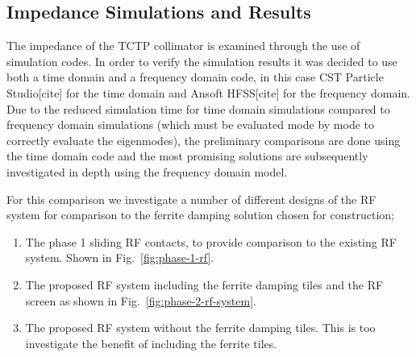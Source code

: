 \subsection{Impedance Simulations and Results}
\label{sec:imp-sims-tctp}

The impedance of the TCTP collimator is examined through the use of simulation codes. In order to verify the simulation results it was decided to use both a time domain and a frequency domain code, in this case CST Particle Studio[cite] for the time domain and Ansoft HFSS[cite] for the frequency domain. Due to the reduced simulation time for time domain simulations compared to frequency domain simulations (which must be evaluated mode by mode to correctly evaluate the eigenmodes), the preliminary comparisons are done using the time domain code and the most promising solutions are subsequently investigated in depth using the frequency domain model.

For this comparison we investigate a number of different designs of the RF system for comparison to the ferrite damping solution chosen for construction;

\begin{enumerate}
\item{The phase 1 sliding RF contacts, to provide comparison to the existing RF system. Shown in Fig.~\ref{fig:phase-1-rf}.}
\item{The proposed RF system including the ferrite damping tiles and the RF screen as shown in Fig.~\ref{fig:phase-2-rf-system}.}
\item{The proposed RF system without the ferrite damping tiles. This is too investigate the benefit of including the ferrite tiles.}
\end{enumerate}


